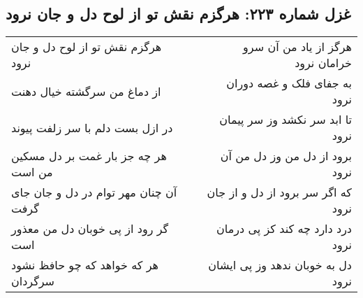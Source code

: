 \begin{center}
\section*{غزل شماره ۲۲۳: هرگزم نقش تو از لوح دل و جان نرود}
\label{sec:sh223}
\begin{longtable}{l p{0.5cm} r}
هرگزم نقش تو از لوح دل و جان نرود
&&
هرگز از یاد من آن سرو خرامان نرود
\\
از دماغ من سرگشته خیال دهنت
&&
به جفای فلک و غصه دوران نرود
\\
در ازل بست دلم با سر زلفت پیوند
&&
تا ابد سر نکشد وز سر پیمان نرود
\\
هر چه جز بار غمت بر دل مسکین من است
&&
برود از دل من وز دل من آن نرود
\\
آن چنان مهر توام در دل و جان جای گرفت
&&
که اگر سر برود از دل و از جان نرود
\\
گر رود از پی خوبان دل من معذور است
&&
درد دارد چه کند کز پی درمان نرود
\\
هر که خواهد که چو حافظ نشود سرگردان
&&
دل به خوبان ندهد وز پی ایشان نرود
\\
\end{longtable}
\end{center}
